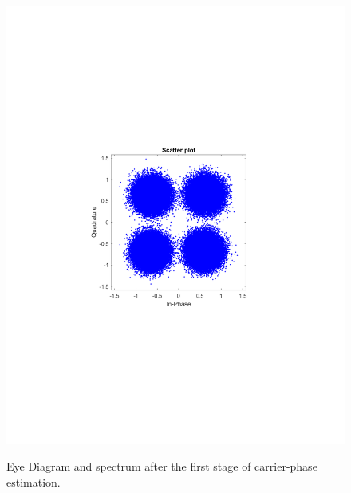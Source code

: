 \begin{refsection}
\begin{figure}[H]
\begin{minipage}{0.30\textwidth}
		\includegraphics[clip, trim=4cm 8cm 4cm 8cm, width=1\textwidth]{./sdf/m_qam_system/figures/expResults/intradyne/5_const_16GBdInSig13dB_AfPE.pdf}
		\label{fig:16GBdSpecBefFec}
	\end{minipage}
	\caption{Eye Diagram and spectrum after the first stage of carrier-phase estimation.}
\end{figure}


\end{refsection}
